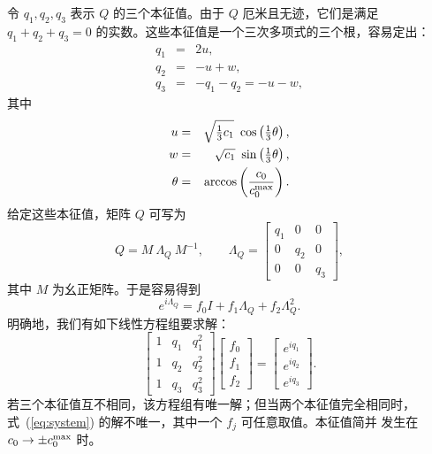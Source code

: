 令 $q_1,q_2,q_3$ 表示 $Q$ 的三个本征值。由于 $Q$ 厄米且无迹，它们是满足
$q_1+q_2+q_3=0$ 的实数。这些本征值是一个三次多项式的三个根，容易定出：
\begin{eqnarray}
q_1 &=& 2u,\\
q_2 &=& -u+w,\\
q_3 &=& -q_1-q_2=-u-w,
\end{eqnarray}
其中
\begin{eqnarray}
u &=& \sqrt{\textstyle\frac{1}{3}c_1}
  \ \cos\left(\textstyle\frac{1}{3}\theta\right),\label{eq:udef}\\
w &=& \sqrt{c_1}\ \sin\left(\textstyle\frac{1}{3}\theta\right),\label{eq:wdef}\\
\theta &=& \arccos\left(\frac{c_0}{c_0^{\rm max}}\right).\label{eq:thetadef}
\end{eqnarray}
给定这些本征值，矩阵 $Q$ 可写为
\begin{equation}
 Q = M\ \Lambda_Q\ M^{-1},\qquad
\Lambda_Q= \left[\begin{array}{ccc} q_1 &0 & 0\\ 0 & q_2 & 0\\
 0 & 0 & q_3\end{array}\right] ,
\end{equation}
其中 $M$ 为幺正矩阵。于是容易得到
\begin{equation}
  e^{i \Lambda_Q}=f_0 I + f_1\Lambda_Q + f_2\Lambda_Q^2.
\end{equation}
明确地，我们有如下线性方程组要求解：
\begin{equation}
 \left[\begin{array}{ccc} 1 & q_1 & q_1^2 \\
  1 & q_2 & q_2^2 \\  1 & q_3 & q_3^2
 \end{array}\right]\left[\begin{array}{c}
  f_0\\f_1\\f_2\end{array}\right]=\left[\begin{array}{c}
 e^{i q_1}\\e^{i q_2}\\e^{i q_3}\end{array}\right].
\label{eq:system}\end{equation}
若三个本征值互不相同，该方程组有唯一解；但当两个本征值完全相同时，
式~(\ref{eq:system}) 的解不唯一，其中一个 $f_j$ 可任意取值。本征值简并
发生在 $c_0\rightarrow \pm c_0^{\rm max}$ 时。

